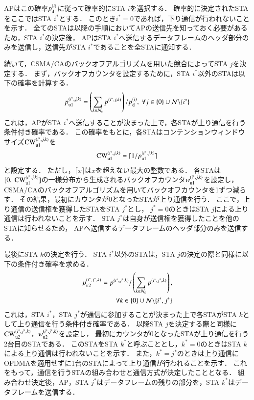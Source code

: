 \documentclass[master]{kuisthesis}		%
\newcommand{\mthnk}{{\mathcal N}_k}
\begin{document}
			APはこの確率$p_{\rm d}^{(i)}$に従って確率的にSTA $i$を選択する．
			確率的に決定されたSTAをここではSTA $i^*$とする．
			このとき$i^*=0$であれば，下り通信が行われないことを示す．
			全てのSTAは以降の手順においてAPの送信先を知っておく必要があるため，STA $i^*$の決定後，
			APはSTA $i^*$へ送信するデータフレームのヘッダ部分のみを送信し，送信先がSTA $i^*$であることを全STAに通知する．
			\par
			続いて，CSMA/CAのバックオフアルゴリズムを用いた競合によってSTA $j$を決定する．
			まず，バックオフカウンタを設定するために，STA $i^*$以外のSTAは以下の確率を計算する．
			\begin{align}
				p_{\rm u1}^{(i^*,j,k)}=\left(\sum_{k\in\mthnk} p^{(i^*,j,k)}\right) / p_{\rm d}^{(i)},\ \forall j \in \{0\}\cup{\mathcal N}\backslash \{i^*\}
			\end{align}
			これは，APがSTA $i^*$へ送信することが決まった上で，各STAが上り通信を行う条件付き確率である．
			この確率をもとに，各STAはコンテンションウィンドウサイズ${\rm CW}^{(i^*,j,k)}_{\rm u1}$を
			\begin{equation}
				{\rm CW}^{(i^*,j,k)}_{\rm u1} = \lceil 1/p_{\rm u1}^{(i^*,j,k)} \rceil
			\end{equation}
			と設定する．
			ただし，$\lceil x \rceil$は$x$を超えない最大の整数である．
			各STAは$[0,\ {\rm CW}^{(i^*,j,k)}_{\rm u1}]$の一様分布から生成されるバックオフカウンタ$w_{\rm u1}^{(i^*,j,k)}$を設定し，
			CSMA/CAのバックオフアルゴリズムを用いてバックオフカウンタを1ずつ減らす．
			その結果，最初にカウンタが0となったSTAが上り通信を行う．
			ここで，上り通信の送信権を獲得したSTAをSTA $j^*$とし，
			$j^*=0$のときはSTA $j$による上り通信は行われないことを示す．
			STA $j^*$は自身が送信権を獲得したことを他のSTAに知らせるため，
			APへ送信するデータフレームのヘッダ部分のみを送信する．
			\par
			最後にSTA $k$の決定を行う．
			STA $i^*$以外のSTAは，STA $j$の決定の際と同様に以下の条件付き確率を求める．
			\begin{align}
				p_{\rm u2}^{(i^*,j^*,k)}=p^{(i^*,j^*,k)} / \left(\sum_{k\in\mthnk} p^{(i^*,j^*,k)}\right), \nonumber\\
				\qquad\qquad\forall k \in \{0\}\cup{\mathcal N}\backslash \{i^*,j^*\}
			\end{align}
			これは，STA $i^*$，STA $j^*$が通信に参加することが決まった上で各STAがSTA $k$として上り通信を行う条件付き確率である．
			以降STA $j$を決定する際と同様に${\rm CW}^{(i^*,j^*,k)}_{\rm u2}$，$w_{\rm u2}^{(i^*,j^*,k)}$を設定し，
			最初にカウンタが0となったSTAが上り通信を行う2台目のSTAである．
			このSTAをSTA $k^*$と呼ぶこととし，$k^*=0$のときはSTA $k$による上り通信は行われないことを示す．
			また，$k^*=j^*$のときは上り通信にOFDMAを適用せずに1台のSTAによって上り通信が行われることを示す．
			これをもって，通信を行うSTAの組み合わせと通信方式が決定したこととなる．
			組み合わせ決定後，AP，STA $j^*$はデータフレームの残りの部分を，STA $k^*$はデータフレームを送信する．
\end{document}
